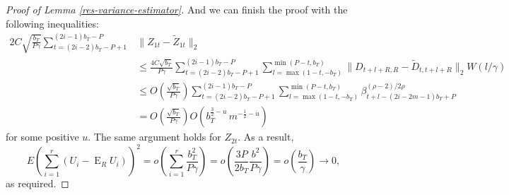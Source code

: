 \documentclass[11pt]{article}
\DeclareMathOperator{\E}{E}
\newcommand{\vtSumr}{\ensuremath{\sum_{i=1}^r}}
\newcommand{\vtSuma}{\ensuremath{\sum_{t=(2i-2)b_T-P+1}^{(2i-1)b_T-P}}}
\newcommand{\vttLower}{\ensuremath{\max(1-t,-b_T)}}
\newcommand{\vttUpper}{\ensuremath{\min(P-t,b_T)}}
\newcommand{\couplingBeta}[1]{\ensuremath{\beta^{(\rho-2)/2\rho}_{#1}}}
\begin{document}
\begin{proof}[Proof of Lemma \ref{res-variance-estimator}]
And we can finish the proof with the following inequalities:
\begin{align*}
  2 C \sqrt{\frac{b_T}{P \gamma}} \vtSuma & \lVert Z_{1t} - \tilde{Z}_{1t} \rVert_2 \\& \leq
  \frac{4C \sqrt{b_T}}{P\gamma} \vtSuma \sum_{l=\vttLower}^{\vttUpper} \lVert
  D_{t+l+R,R} - \tilde{D}_{t,t+l+R} \rVert_2 W(l/\gamma) \\&
  \leq O(\frac{\sqrt{b_T}}{P\gamma}) \vtSuma
  \sum_{l=\vttLower}^{\vttUpper} \couplingBeta{t+l-(2i-2m-1)b_T+P}\\&
  = O(\frac{\sqrt{b_T}}{P\gamma}) O(b_T^{\frac32-u}\, m^{-\frac12-u})
\end{align*}
for some positive $u$.  The same argument holds for $Z_{2t}$.
As a result,
\[
E(\vtSumr (U_i - \E_R U_i))^2 = o(\vtSumr \frac{b_T^2}{P\gamma}) =
o(\frac{3P}{2b_T} \frac{b^2}{P\gamma}) = o(\frac{b_T}{\gamma}) \to 0,
\]
as required.
\end{proof}
\end{document}
